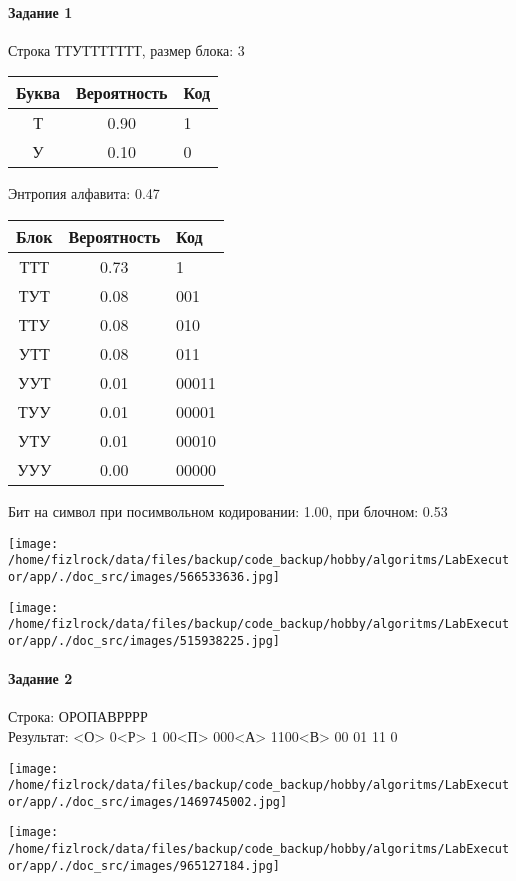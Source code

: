 \documentclass[a4paper, 12pt]{article}
\begin{document}
\paragraph{Задание 1}

Строка ТТУТТТТТТТ, размер блока: 3
\begin{center}
 \begin{tabular}{ |c|c|l| } 
  \hline
     Буква & Вероятность & Код\\ \hline
Т & 0.90 & 1\\\hline
У & 0.10 & 0
\\ \hline \end{tabular}
\end{center}
Энтропия алфавита: 0.47
\begin{center}
 \begin{tabular}{ |c|c|l| } 
  \hline
     Блок & Вероятность & Код\\ \hline
ТТТ & 0.73 & 1\\\hline
ТУТ & 0.08 & 001\\\hline
ТТУ & 0.08 & 010\\\hline
УТТ & 0.08 & 011\\\hline
УУТ & 0.01 & 00011\\\hline
ТУУ & 0.01 & 00001\\\hline
УТУ & 0.01 & 00010\\\hline
УУУ & 0.00 & 00000
\\ \hline \end{tabular}
\end{center}
Бит на символ при посимвольном кодировании: 1.00, при блочном: 0.53

\texttt{[image: /home/fizlrock/data/files/backup/code\_backup/hobby/algoritms/LabExecutor/app/./doc\_src/images/566533636.jpg]}

\texttt{[image: /home/fizlrock/data/files/backup/code\_backup/hobby/algoritms/LabExecutor/app/./doc\_src/images/515938225.jpg]}
\pagebreak
\paragraph{Задание 2}

Строка: 
ОРОПАВРРРР\\
Результат: <О> 0<Р> 1 00<П> 000<А> 1100<В> 00 01 11 0

\texttt{[image: /home/fizlrock/data/files/backup/code\_backup/hobby/algoritms/LabExecutor/app/./doc\_src/images/1469745002.jpg]}

\texttt{[image: /home/fizlrock/data/files/backup/code\_backup/hobby/algoritms/LabExecutor/app/./doc\_src/images/965127184.jpg]}
\end{document}
